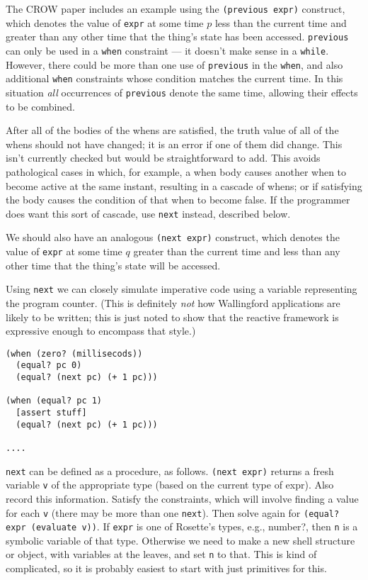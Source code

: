 \documentclass{article}
\begin{document}
The CROW paper includes an example using the \verb|(previous expr)|
construct, which denotes the value of \verb|expr| at some time $p$ less
than the current time and greater than any other time that the thing's
state has been accessed.  \verb|previous| can only be used in a \verb|when|
constraint --- it doesn't make sense in a \verb|while|.  However, there
could be more than one use of \verb|previous| in the \verb|when|, and also
additional \verb|when| constraints whose condition matches the current
time.  In this situation \emph{all} occurrences of \verb|previous| denote
the same time, allowing their effects to be combined.  

After all of the bodies of the whens are satisfied, the truth value of all
of the whens should not have changed; it is an error if one of them did
change.  This isn't currently checked but would be straightforward to add.
This avoids pathological cases in which, for example, a when body causes
another when to become active at the same instant, resulting in a cascade
of whens; or if satisfying the body causes the condition of that when to
become false.  If the programmer does want this sort of cascade, use
\verb|next| instead, described below.

We should also have an analogous \verb|(next expr)| construct, which
denotes the value of \verb|expr| at some time $q$ greater than the current
time and less than any other time that the thing's state will be accessed.

Using \verb|next| we can closely simulate imperative code using a variable
representing the program counter.  (This is definitely \emph{not} how
Wallingford applications are likely to be written; this is just noted to
show that the reactive framework is expressive enough to encompass that
style.)

\begin{verbatim}
(when (zero? (millisecods))
  (equal? pc 0)
  (equal? (next pc) (+ 1 pc)))

(when (equal? pc 1)
  [assert stuff]
  (equal? (next pc) (+ 1 pc)))

....
\end{verbatim}

\verb|next| can be defined as a procedure, as follows.  \verb|(next expr)|
returns a fresh variable \verb|v| of the appropriate type (based on the
current type of expr).  Also record this information.  Satisfy the
constraints, which will involve finding a value for each \verb|v| (there
may be more than one \verb|next|).  Then solve again for
\verb|(equal? expr (evaluate v))|.  If \verb|expr| is one of Rosette's
types, e.g., number?, then \verb|n| is a symbolic variable of that type.
Otherwise we need to make a new shell structure or object, with variables
at the leaves, and set \verb|n| to that.  This is kind of complicated, so
it is probably easiest to start with just primitives for this.
\end{document}
